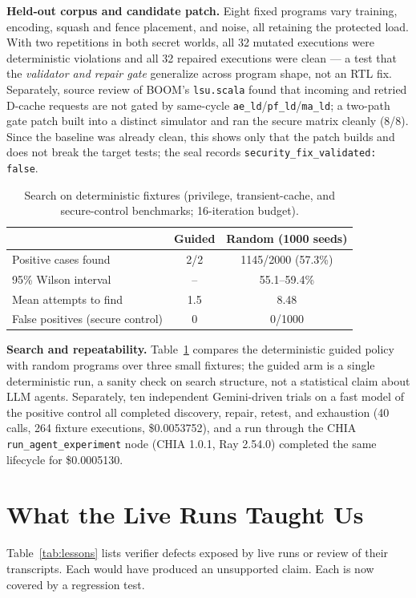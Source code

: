 \documentclass[conference,10pt]{IEEEtran}
\begin{document}
\textbf{Held-out corpus and candidate patch.} Eight fixed programs vary training,
encoding, squash and fence placement, and noise, all retaining the protected load.
With two repetitions in both secret worlds, all 32 mutated executions were
deterministic violations and all 32 repaired executions were clean --- a test that
the \emph{validator and repair gate} generalize across program shape, not an RTL
fix. Separately, source review of BOOM's \texttt{lsu.scala} found that incoming
and retried D-cache requests are not gated by same-cycle
\texttt{ae\_ld}/\texttt{pf\_ld}/\texttt{ma\_ld}; a two-path gate patch built into a
distinct simulator and ran the secure matrix cleanly (8/8). Since the baseline was
already clean, this shows only that the patch builds and does not break the target
tests; the seal records \texttt{security\_fix\_validated: false}.

\begin{table}[t]
\centering
\caption{Search on deterministic fixtures (privilege, transient-cache, and
secure-control benchmarks; 16-iteration budget).}
\label{tab:search}
\footnotesize
\begin{tabular}{@{}lcc@{}}
\toprule
 & Guided & Random (1000 seeds) \\
\midrule
Positive cases found & 2/2 & 1145/2000 (57.3\%) \\
95\% Wilson interval & -- & 55.1--59.4\% \\
Mean attempts to find & 1.5 & 8.48 \\
False positives (secure control) & 0 & 0/1000 \\
\bottomrule
\end{tabular}
\end{table}

\textbf{Search and repeatability.} Table~\ref{tab:search} compares the
deterministic guided policy with random programs over three small fixtures; the
guided arm is a single deterministic run, a sanity check on search structure, not
a statistical claim about LLM agents. Separately, ten independent Gemini-driven
trials on a fast model of the positive control all completed discovery, repair,
retest, and exhaustion (40 calls, 264 fixture executions, \$0.0053752), and a run
through the CHIA \texttt{run\_agent\_experiment} node (CHIA 1.0.1, Ray 2.54.0)
completed the same lifecycle for \$0.0005130.

\section{What the Live Runs Taught Us}\label{sec:lessons}
Table~\ref{tab:lessons} lists verifier defects exposed by live runs or
review of their transcripts. Each would have produced an unsupported claim.
Each is now covered by a regression test.
\end{document}
